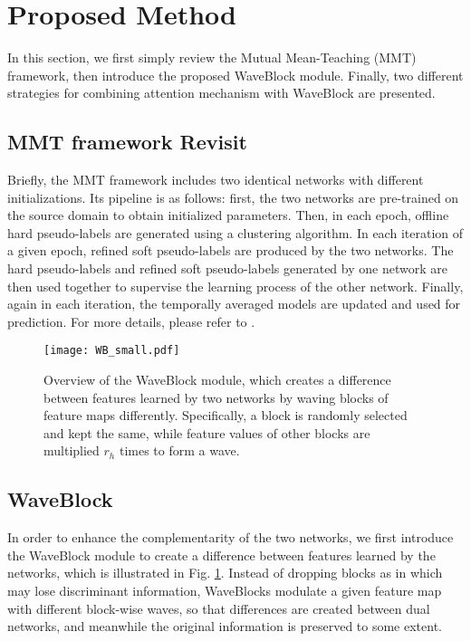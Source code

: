 \documentclass[journal]{IEEEtran}
\begin{document}
\section{Proposed Method}
In this section, we first simply review the Mutual Mean-Teaching (MMT) framework, then introduce the proposed WaveBlock module. Finally, two different strategies for combining attention mechanism with WaveBlock are presented.

\subsection{MMT framework Revisit}
Briefly, the MMT framework includes two identical networks with different initializations. Its pipeline is as follows: first, the two networks are pre-trained on the source domain to obtain initialized parameters. Then, in each epoch, offline hard pseudo-labels are generated using a clustering algorithm. In each iteration of a given epoch, refined soft pseudo-labels are produced by the two networks. The hard pseudo-labels and refined soft pseudo-labels generated by one network are then used together to supervise the learning process of the other network. Finally, again in each iteration, the temporally averaged models are updated and used for prediction. For more details, please refer to \cite{ge2020mutual}.
\begin{figure}
\centering
\texttt{[image: WB\_small.pdf]}
\caption{Overview of the WaveBlock module, which creates a difference between features learned by two networks by waving blocks of feature maps differently. Specifically, a block is randomly selected and kept the same, while feature values of other blocks are multiplied $r_h$ times to form a wave.}
\label{WB}
\end{figure}
\subsection{WaveBlock}
In order to enhance the complementarity of the two networks, we first introduce the WaveBlock module to create a difference  between features learned by the networks, which is illustrated in Fig. \ref{WB}. Instead of dropping blocks as in \cite{ghiasi2018dropblock} which may lose discriminant information, WaveBlocks modulate a given feature map with different block-wise waves, so that differences are created between dual networks, and meanwhile the original information is preserved to some extent.\par 
\end{document}
